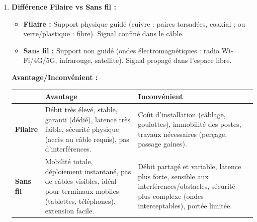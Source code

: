 \documentclass[11pt]{article}
\begin{document}
\begin{corrige}
\begin{enumerate}
  \item \textbf{Différence Filaire vs Sans fil :}
  \begin{itemize}
    \item \textbf{Filaire :} Support physique guidé (cuivre : paires torsadées, coaxial ; ou verre/plastique : fibre). Signal confiné dans le câble.
    \item \textbf{Sans fil :} Support non guidé (ondes électromagnétiques : radio Wi-Fi/4G/5G, infrarouge, satellite). Signal propagé dans l'espace libre.
  \end{itemize}
  \textbf{Avantage/Inconvénient :}
  \begin{center}
  \begin{tabularx}{\linewidth}{|l|X|X|}
  \hline
  \rowcolor{popblueL} & \textbf{Avantage} & \textbf{Inconvénient} \\
  \hline
  \textbf{Filaire} & Débit très élevé, stable, garanti (dédié), latence très faible, sécurité physique (accès au câble requis), pas d'interférences. & Coût d'installation (câblage, goulottes), immobilité des postes, travaux nécessaires (perçage, passage gaines). \\
  \hline
  \textbf{Sans fil} & Mobilité totale, déploiement instantané, pas de câbles visibles, idéal pour terminaux mobiles (tablettes, téléphones), extension facile. & Débit partagé et variable, latence plus forte, sensible aux interférences/obstacles, sécurité plus complexe (ondes interceptables), portée limitée. \\
  \hline
  \end{tabularx}
  \end{center}
  

\end{enumerate}
\end{corrige}
\end{document}
